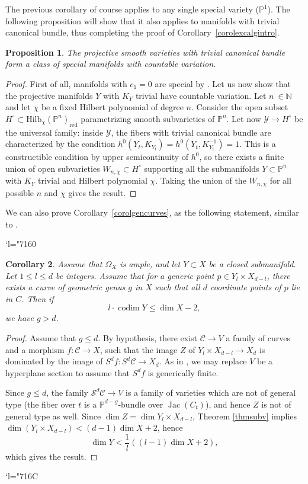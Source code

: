\documentclass[JEP,XML,SOM,Unicode, NoEqCountersInSection,NoFloatCountersInSection,published]{cedram}
\let\mathcal\mathscr
\newcommand{\Changel}{\mathcode`l="7160}
\newcommand{\Changelback}{\mathcode`l="716C}
\newcommand{\red}{\mathrm{red}}
\DeclareMathOperator{\codim}{codim}
\DeclareMathOperator{\Jac}{Jac}
\theoremstyle{theorem}
\newtheorem{proposition}{Proposition} [section]
\newtheorem{corollary}[proposition]{Corollary}
\theoremstyle{definition}
\def\bP{{\mathbb P}}
\begin{document}
The previous corollary of course applies to any single special variety (\eg \(\bP^{1}\)). The following proposition will show that it also applies to manifolds with trivial canonical bundle, thus completing the proof of Corollary~\ref{corolexcalgintro}.

\begin{proposition}
The projective smooth varieties with trivial canonical bundle form a class of special manifolds with countable variation.
\end{proposition}
\begin{proof}
First of all, manifolds with \(c_{1} = 0\) are special by \cite[Cor.\,2.28]{Cam04}. Let us now show that the projective manifolds \(Y\) with \(K_{Y}\) trivial have countable variation. Let \(n\ \in \mathbb{N}\) and let \(\chi\) be a fixed Hilbert polynomial of degree \(n\). Consider the open subset \(H^{\circ} \subset \mathrm{Hilb}_{\chi}(\bP^{n})_{\red}\) parametrizing smooth subvarieties of \(\bP^{n}\). Let now \(\mathcal{Y} \to H^{\circ}\) be the universal family: inside \(\mathcal{Y}\), the fibers with trivial canonical bundle are characterized by the condition \(h^{0}(Y_{t}, K_{Y_{t}}) = h^{0}(Y_{t}, K_{Y_{t}}^{-1}) = 1\). This is a constructible condition by upper semicontinuity of \(h^{0}\), so there exists a finite union of open subvarieties \(W_{n, \chi} \subset H^{\circ}\) supporting all the submanifolds \(Y \subset \bP^{n}\) with \(K_{Y}\) trivial and Hilbert polynomial \(\chi\). Taking the union of the \(W_{n, \chi}\) for all possible \(n\) and \(\chi\) gives the result.
\end{proof}

We can also prove Corollary~\ref{corolgencurves}, as the following statement, similar to \cite[Cor.\,4]{AA02}.

\Changel
\begin{corollary} \label{cor:gencurvestext}
Assume that $\Omega_X$ is ample, and let $Y \subset X$ be a closed submanifold. Let $1 \leq l \leq d$ be integers. Assume that for a generic point \(p \in Y_{l} \times X_{d-l}\), there exists a curve of geometric genus \(g\) in \(X\) such that all \(d\) coordinate points of \(p\) lie in \(C\).
Then if
\[
l \cdot \codim  Y \leq \dim X - 2,
\]
we have $g > d$.
\end{corollary}

\begin{proof}
Assume that $g \leq d$. By hypothesis, there exist $\mathcal C \to V$ a family of curves and a morphism $f : \mathcal C \to X$, such that the image $Z$ of $Y_l \times X_{d-l} \to X_d$ is dominated by the image of $S^d f :S^d \mathcal C \to X_d$. As in \cite{AA02}, we may replace $V$ be a hyperplane section to assume that $S^d f$ is generically finite.

Since $g \leq d$, the family $\mathcal S^d {\mathcal C} \to V$ is a family of varieties which are not of general type (the fiber over $t$ is a $\mathbb P^{d-g}$-bundle over $\Jac(C_t)$), and hence $Z$ is not of general type as well. Since $\dim Z = \dim Y_l \times X_{d-l}$, Theorem \ref{thmsubv} implies $\dim(Y_l \times X_{d-l}) < (d-1) \dim X + 2$, hence
\[
\dim Y < \frac{1}{l} \left( (l-1) \dim X + 2\right),
\]
which gives the result.
\end{proof}
\Changelback
\end{document}
